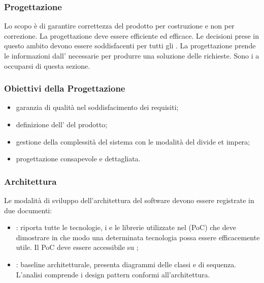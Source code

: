 \subsubsection{Progettazione}
Lo scopo è di garantire correttezza del prodotto per costruzione e non per correzione. La progettazione deve essere
efficiente ed efficace. Le decisioni prese in questo ambito devono essere soddisfacenti per tutti gli .
La progettazione prende le informazioni dall' \docNameVersionAdR{} necessarie per produrre una soluzione delle richieste.
Sono i \roleDesignerP{} a occuparsi di questa sezione.

\subsubsection{Obiettivi della Progettazione}
\begin{itemize}
    \item garanzia di qualità nel soddisfacimento dei requisiti;
    \item definizione dell' del prodotto;
    \item gestione della complessità del sistema con le modalità del divide et impera;
    \item progettazione consapevole e dettagliata.
\end{itemize}

\subsubsection{Architettura}
Le modalità di sviluppo dell'architettura del software devono essere registrate in due documenti:
\begin{itemize}
    \item \textbf{}: riporta tutte le tecnologie, i  e le librerie utilizzate nel  (PoC) che deve dimostrare in che modo una determinata tecnologia possa essere efficacemente utile. Il PoC deve essere accessibile su ;
    \item \textbf{}: baseline architetturale, presenta diagrammi delle classi e di sequenza. L'analisi comprende i design pattern conformi all'architettura.
\end{itemize}

